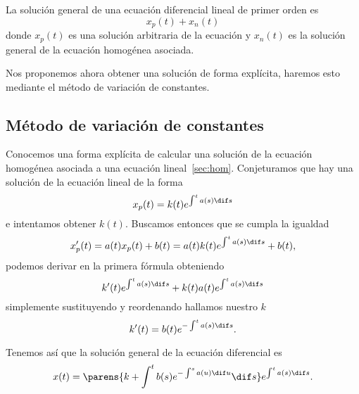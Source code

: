 \documentclass[../main.tex]{subfiles}
\begin{document}
\begin{corollary}
	La solución general de una ecuación diferencial lineal de primer orden es 
	\[x_p(t) + x_n(t)\]
	donde \(x_p(t)\) es una solución arbitraria de la ecuación y \(x_n(t)\) es
	la solución general de la ecuación homogénea asociada.
\end{corollary}

Nos proponemos ahora obtener una solución de forma explícita, haremos esto
mediante el método de variación de constantes.

\subsection{Método de variación de constantes}

Conocemos una forma explícita de calcular una solución de la ecuación homogénea
asociada a una ecuación lineal~\autoref{sec:hom}. Conjeturamos que hay una 
solución de la ecuación lineal de la forma
\[x_p(t) = k(t) e^{\int^t a(s) \dif s}\]
e intentamos obtener \(k(t)\). Buscamos entonces que se cumpla la igualdad
\[x'_p(t) = a(t)x_p(t) + b(t) = a(t)k(t) e^{\int^t a(s) \dif s} + b(t),\]
podemos derivar en la primera fórmula obteniendo
\[k'(t) e^{\int^t a(s) \dif s} + k(t)a(t) e^{\int^t a(s) \dif s}\]
simplemente sustituyendo y reordenando hallamos nuestro \(k\)
\[k'(t) = b(t)e^{-\int^t a(s) \dif s}.\]

Tenemos así que la solución general de la ecuación diferencial es 
\[x(t) = \parens{k + \int^t b(s) e^{-\int^s a(u) \dif u} \dif s} 
	e^{\int^t a(s) \dif s}.\]
\end{document}
